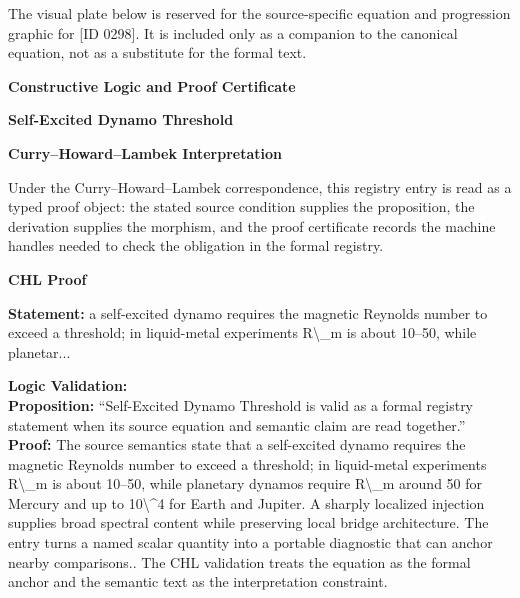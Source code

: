 \begingroup\footnotesize\sloppy
The visual plate below is reserved for the source-specific equation and progression graphic for [ID 0298]. It is included only as a companion to the canonical equation, not as a substitute for the formal text.
\par\endgroup
\ifTZPDarkEdition
{}
\fi

\clearpage
\begingroup\tzpsupportsetup
\noindent\textbf{\fontsize{10.8pt}{12.8pt}\selectfont [ID 0298] Constructive Logic and Proof Certificate}\par
\noindent\textbf{\fontsize{10pt}{12pt}\selectfont Self-Excited Dynamo Threshold}\par
\vspace{0.45em}
\begingroup
\footnotesize
\setlength{\parskip}{0.22em}
\setlength{\parindent}{0pt}
\noindent\textbf{Curry--Howard--Lambek Interpretation}\par
Under the Curry--Howard--Lambek correspondence, this registry entry is read as a typed proof
object: the stated source condition supplies the proposition, the derivation supplies the
morphism, and the proof certificate records the machine handles needed to check the obligation
in the formal registry.

\vspace{0.45em}
\noindent\textbf{CHL Proof}\par
\textbf{Statement:} a self-excited dynamo requires the magnetic Reynolds number to exceed a threshold; in
liquid-metal experiments R\textbackslash{}\_m is about 10--50, while planetar...

\textbf{Logic Validation:}\\
\textbf{Proposition:} ``Self-Excited Dynamo Threshold is valid as a formal registry statement when its source
equation and semantic claim are read together.''\\
\textbf{Proof:} The source semantics state that a self-excited dynamo requires the magnetic Reynolds
number to exceed a threshold; in liquid-metal experiments R\textbackslash{}\_m is about 10--50, while
planetary dynamos require R\textbackslash{}\_m around 50 for Mercury and up to 10\textbackslash{}\textasciicircum{}4 for Earth and
Jupiter. A sharply localized injection supplies broad spectral content while preserving
local bridge architecture. The entry turns a named scalar quantity into a portable
diagnostic that can anchor nearby comparisons.. The CHL validation treats the equation
as the formal anchor and the semantic text as the interpretation constraint.


